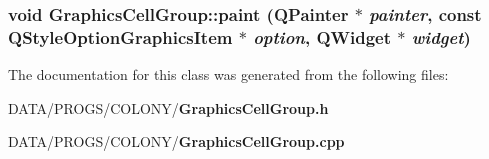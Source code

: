 \subsubsection{\setlength{\rightskip}{0pt plus 5cm}void GraphicsCellGroup::paint (QPainter $\ast$ {\em painter}, \/  const QStyleOptionGraphicsItem $\ast$ {\em option}, \/  QWidget $\ast$ {\em widget})}\label{classGraphicsCellGroup_ddd239c0e204a71c5202de8ee37a2734}




The documentation for this class was generated from the following files:\begin{CompactItemize}
\item 
DATA/PROGS/COLONY/{\bf GraphicsCellGroup.h}\item 
DATA/PROGS/COLONY/{\bf GraphicsCellGroup.cpp}\end{CompactItemize}
